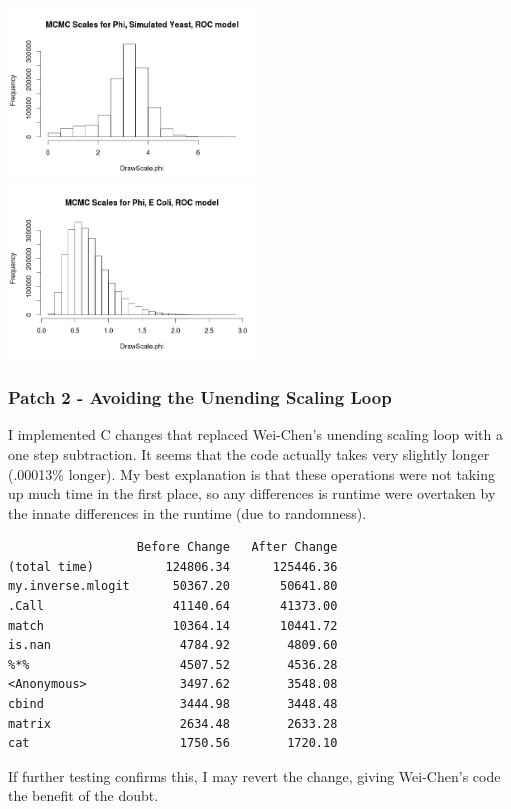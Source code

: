 \includegraphics[width=0.5\textwidth]{data/oct17-RocYeastScales.png}
\includegraphics[width=0.5\textwidth]{data/oct20-RocEcoliScales.png}

\subsubsection{Patch 2 - Avoiding the Unending Scaling Loop}

I implemented C changes that replaced Wei-Chen's unending scaling loop with a one step subtraction. It seems that the code actually takes very slightly longer (.00013\% longer). My best explanation is that these operations were not taking up much time in the first place, so any differences is runtime were overtaken by the innate differences in the runtime (due to randomness).

\begin{verbatim}
                  Before Change   After Change
(total time)          124806.34      125446.36
my.inverse.mlogit      50367.20       50641.80
.Call                  41140.64       41373.00
match                  10364.14       10441.72
is.nan                  4784.92        4809.60
%*%                     4507.52        4536.28
<Anonymous>             3497.62        3548.08
cbind                   3444.98        3448.48
matrix                  2634.48        2633.28
cat                     1750.56        1720.10
\end{verbatim}

If further testing confirms this, I may revert the change, giving Wei-Chen's code the benefit of the doubt.

